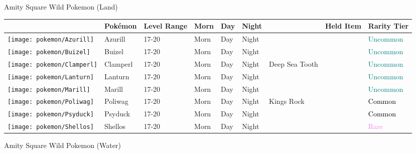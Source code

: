 \caption{Amity Square Wild Pokemon (Land)}%
\begin{longtable}{||l l l l l l l l l||}%
\hline%
&Pokémon&Level Range&Morn&Day&Night&&Held Item&Rarity Tier\\%
\hline%
\endhead%
\hline%
\texttt{[image: pokemon/Azurill]}&Azurill&17{-}20&Morn&Day&Night&&&\textcolor{teal}{%
Uncommon%
}\\%
\hline%
\texttt{[image: pokemon/Buizel]}&Buizel&17{-}20&Morn&Day&Night&&&\textcolor{teal}{%
Uncommon%
}\\%
\hline%
\texttt{[image: pokemon/Clamperl]}&Clamperl&17{-}20&Morn&Day&Night&Deep Sea Tooth&&\textcolor{teal}{%
Uncommon%
}\\%
\hline%
\texttt{[image: pokemon/Lanturn]}&Lanturn&17{-}20&Morn&Day&Night&&&\textcolor{teal}{%
Uncommon%
}\\%
\hline%
\texttt{[image: pokemon/Marill]}&Marill&17{-}20&Morn&Day&Night&&&\textcolor{teal}{%
Uncommon%
}\\%
\hline%
\texttt{[image: pokemon/Poliwag]}&Poliwag&17{-}20&Morn&Day&Night&Kings Rock&&\textcolor{black}{%
Common%
}\\%
\hline%
\texttt{[image: pokemon/Psyduck]}&Psyduck&17{-}20&Morn&Day&Night&&&\textcolor{black}{%
Common%
}\\%
\hline%
\texttt{[image: pokemon/Shellos]}&Shellos&17{-}20&Morn&Day&Night&&&\textcolor{violet}{%
Rare%
}\\%
\hline%
\end{longtable}%
\caption{Amity Square Wild Pokemon (Water)}